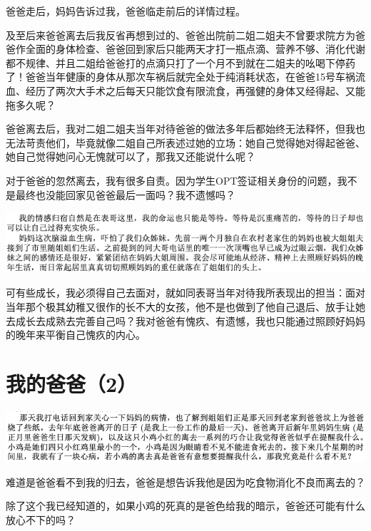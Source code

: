 \documentclass[9pt, b5paper]{article}
\begin{document}
爸爸走后，妈妈告诉过我，爸爸临走前后的详情过程。

及至后来爸爸离去后我反省再想到过的、爸爸出院前二姐二姐夫不曾要求院方为爸爸作全面的身体检查、爸爸回到家后只能两天才打一瓶点滴、营养不够、消化代谢都不规律、并且二姐给爸爸打的点滴只打了一个月不到就在二姐夫的吆喝下停药了！爸爸当年健康的身体从那次车祸后就完全处于纯消耗状态，在爸爸15号车祸流血、经历了两次大手术之后每天只能饮食有限流食，再强健的身体又经得起、又能拖多久呢？

爸爸离去后，我对二姐二姐夫当年对待爸爸的做法多年后都始终无法释怀，但我也无法苛责他们，毕竟就像二姐自己所表述过她的立场：她自己觉得她对得起爸爸、她自己觉得她问心无愧就可以了，那我又还能说什么呢？

对于爸爸的忽然离去，我有很多自责。因为学生OPT签证相关身份的问题，我不是最终也没能回家见爸爸最后一面吗？我不遗憾吗？

\begin{center}
\includegraphics[width=.9\linewidth]{./pic/backups_plans_20210417_120117.png}
\end{center}

可有些成长，我必须得自己去面对，就如同表哥当年对待我所表现出的担当：面对当年那个极其幼稚又很作的长不大的女孩，他不是也做到了他自己退后、放手让她去成长去成熟去完善自己吗？我对爸爸有愧疚、有遗憾，我也只能通过照顾好妈妈的晚年来平衡自己愧疚的内心。

\section{我的爸爸（2）}
\label{sec:orgcc6b222}

\begin{center}
\includegraphics[width=.9\linewidth]{./pic/backups_plans_20210415_093929.png}
\end{center}

难道是爸爸看不到我的归去，爸爸是想告诉我他是因为吃食物消化不良而离去的？

除了这个我已经知道的，如果小鸡的死真的是爸色给我的暗示，爸爸还可能有什么放心不下的吗？
\end{document}
